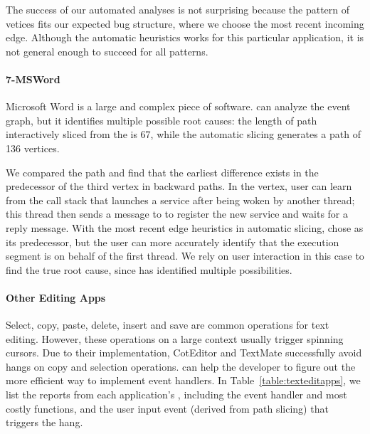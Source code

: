 The success of our automated analyses is not surprising because the pattern of
vetices fits our expected bug structure, where we choose the most recent
incoming edge.  Although the automatic heuristics works for this particular
application, it is not general enough to succeed for all patterns.

\paragraph{7-MSWord}

Microsoft Word is a large and complex piece of software. \xxx can analyze the
event graph, but it identifies multiple possible root causes: the length of
path interactively sliced from the \spinningnode is 67, while the automatic
slicing generates a path of 136 vertices.


We compared the path and find that the earliest difference exists in the
predecessor of the third vertex in backward paths. In the vertex, user can
learn from the call stack that  launches a service
 after being woken by another
 thread; this thread then sends a message to  to
register the new service and waits for a reply message. With the most recent
edge heuristics in automatic slicing, \xxx chose  as its
predecessor, but the user can more accurately identify that the execution
segment is on behalf of the first thread. We rely on user interaction in this
case to find the true root cause, since \xxx has identified multiple
possibilities.

\paragraph{Other Editing Apps}

Select, copy, paste, delete, insert and save are common operations for text
editing. However, these operations on a large context usually trigger spinning
cursors. Due to their implementation, CotEditor and TextMate successfully avoid
hangs on copy and selection operations. \xxx can help the developer to figure
out the more efficient way to implement event handlers. In
Table~\ref{table:texteditapps}, we list the reports from each application's
\spinningnode, including the event handler and most costly functions, and the
user input event (derived from path slicing) that triggers the hang.

